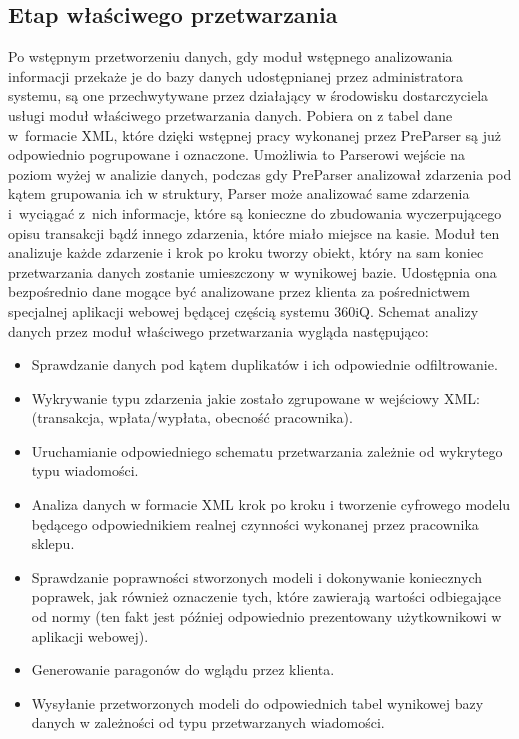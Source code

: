 \documentclass[a4paper]{book}
\begin{document}
\subsection{Etap właściwego przetwarzania}
Po wstępnym przetworzeniu danych, gdy moduł wstępnego analizowania informacji przekaże je do bazy danych udostępnianej przez administratora systemu, są one przechwytywane przez działający w środowisku dostarczyciela usługi moduł właściwego przetwarzania danych. Pobiera on z tabel dane w~formacie XML, które dzięki wstępnej pracy wykonanej przez PreParser są już odpowiednio pogrupowane i oznaczone. Umożliwia to Parserowi wejście na poziom wyżej w analizie danych, podczas gdy PreParser analizował zdarzenia pod kątem grupowania ich w struktury, Parser może analizować same zdarzenia i~wyciągać z~nich informacje, które są konieczne do zbudowania wyczerpującego opisu transakcji bądź innego zdarzenia, które miało miejsce na kasie.
\newline Moduł ten analizuje każde zdarzenie i krok po kroku tworzy obiekt, który na sam koniec przetwarzania danych zostanie umieszczony w wynikowej bazie. Udostępnia ona bezpośrednio dane mogące być analizowane przez klienta za pośrednictwem specjalnej aplikacji webowej będącej częścią systemu 360iQ. Schemat analizy danych przez moduł właściwego przetwarzania wygląda następująco:
\begin{itemize}
\item Sprawdzanie danych pod kątem duplikatów i ich odpowiednie odfiltrowanie.
\item Wykrywanie typu zdarzenia jakie zostało zgrupowane w wejściowy XML: (transakcja, wpłata/wypłata, obecność pracownika).
\item Uruchamianie odpowiedniego schematu przetwarzania zależnie od wykrytego typu wiadomości.
\item Analiza danych w formacie XML krok po kroku i tworzenie cyfrowego modelu będącego odpowiednikiem realnej czynności wykonanej przez pracownika sklepu.
\item Sprawdzanie poprawności stworzonych modeli i dokonywanie koniecznych poprawek, jak również oznaczenie tych, które zawierają wartości odbiegające od normy (ten fakt jest później odpowiednio prezentowany użytkownikowi w aplikacji webowej).
\item Generowanie paragonów do wglądu przez klienta.
\item Wysyłanie przetworzonych modeli do odpowiednich tabel wynikowej bazy danych w zależności od typu przetwarzanych wiadomości.
\end{itemize}
\end{document}
